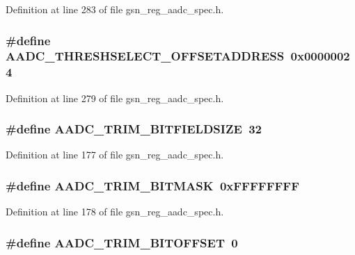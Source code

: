 Definition at line 283 of file gsn\_\-reg\_\-aadc\_\-spec.h.

\hypertarget{a00543_a57a748e916ba4d92d66ce413127d1295}{
\subsubsection[{AADC\_\-THRESHSELECT\_\-OFFSETADDRESS}]{\setlength{\rightskip}{0pt plus 5cm}\#define AADC\_\-THRESHSELECT\_\-OFFSETADDRESS~0x00000024}}
\label{a00543_a57a748e916ba4d92d66ce413127d1295}


Definition at line 279 of file gsn\_\-reg\_\-aadc\_\-spec.h.

\hypertarget{a00543_a961e37cc150b23677ac2f2de5eb10197}{
\subsubsection[{AADC\_\-TRIM\_\-BITFIELDSIZE}]{\setlength{\rightskip}{0pt plus 5cm}\#define AADC\_\-TRIM\_\-BITFIELDSIZE~32}}
\label{a00543_a961e37cc150b23677ac2f2de5eb10197}


Definition at line 177 of file gsn\_\-reg\_\-aadc\_\-spec.h.

\hypertarget{a00543_a9bb7c63510eed4716b95bf244b6d40f9}{
\subsubsection[{AADC\_\-TRIM\_\-BITMASK}]{\setlength{\rightskip}{0pt plus 5cm}\#define AADC\_\-TRIM\_\-BITMASK~0xFFFFFFFF}}
\label{a00543_a9bb7c63510eed4716b95bf244b6d40f9}


Definition at line 178 of file gsn\_\-reg\_\-aadc\_\-spec.h.

\hypertarget{a00543_a8b6462e8c6987af4a7140a63e6cdda05}{
\subsubsection[{AADC\_\-TRIM\_\-BITOFFSET}]{\setlength{\rightskip}{0pt plus 5cm}\#define AADC\_\-TRIM\_\-BITOFFSET~0}}
\label{a00543_a8b6462e8c6987af4a7140a63e6cdda05}


